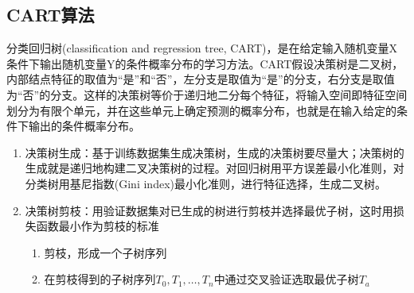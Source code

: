 \subsection*{CART算法}
分类回归树(classification and regression tree, CART)，是在给定输入随机变量X条件下输出随机变量Y的条件概率分布的学习方法。CART假设决策树是二叉树，内部结点特征的取值为“是”和“否”，左分支是取值为“是”的分支，右分支是取值为“否”的分支。这样的决策树等价于递归地二分每个特征，将输入空间即特征空间划分为有限个单元，并在这些单元上确定预测的概率分布，也就是在输入给定的条件下输出的条件概率分布。
\begin{enumerate}
	\item 决策树生成：基于训练数据集生成决策树，生成的决策树要尽量大；决策树的生成就是递归地构建二叉决策树的过程。对回归树用平方误差最小化准则，对分类树用基尼指数(Gini index)最小化准则，进行特征选择，生成二叉树。
	\item 决策树剪枝：用验证数据集对已生成的树进行剪枝并选择最优子树，这时用损失函数最小作为剪枝的标准
	\begin{enumerate}[(1)]
		\item 剪枝，形成一个子树序列
		\item 在剪枝得到的子树序列$T_0,T_1,\dots, T_n$中通过交叉验证选取最优子树$T_a$
	\end{enumerate}
\end{enumerate}

